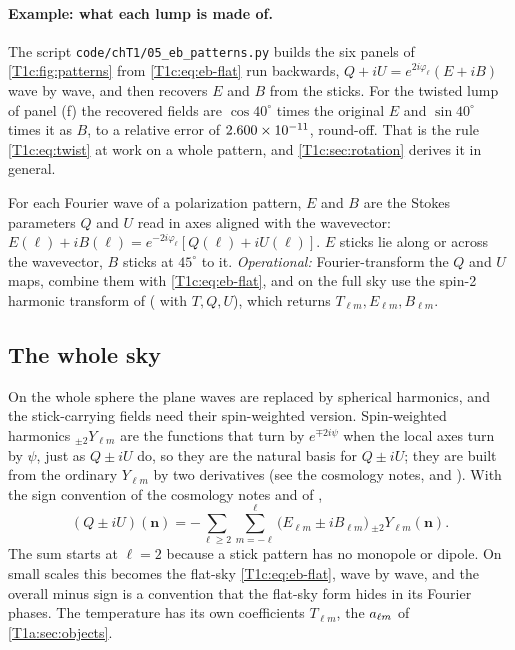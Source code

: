 \paragraph{Example: what each lump is made of.} The script \nolinkurl{code/chT1/05_eb_patterns.py} builds the six panels of \cref{T1c:fig:patterns} from \eqref{T1c:eq:eb-flat} run backwards, $Q+iU=e^{2i\varphi_{\bm\ell}}(E+iB)$ wave by wave, and then recovers $E$ and $B$ from the sticks. For the twisted lump of panel (f) the recovered fields are $\cos40^\circ$ times the original $E$ and $\sin40^\circ$ times it as $B$, to a relative error of $2.600\times10^{-11}$, round-off. That is the rule \eqref{T1c:eq:twist} at work on a whole pattern, and \cref{T1c:sec:rotation} derives it in general.

\begin{workdef}
For each Fourier wave of a polarization pattern, $E$ and $B$ are the Stokes parameters $Q$ and $U$ read in axes aligned with the wavevector: $E(\bm\ell)+iB(\bm\ell)=e^{-2i\varphi_{\bm\ell}}[Q(\bm\ell)+iU(\bm\ell)]$. $E$ sticks lie along or across the wavevector, $B$ sticks at $45^\circ$ to it. \emph{Operational:} Fourier-transform the $Q$ and $U$ maps, combine them with \eqref{T1c:eq:eb-flat}, and on the full sky use the spin-2 harmonic transform of  ( with $T,Q,U$), which returns $T_{\ell m},E_{\ell m},B_{\ell m}$.
\end{workdef}

\subsection{The whole sky}
\label{T1c:sec:eb-sky}

On the whole sphere the plane waves are replaced by spherical harmonics, and the stick-carrying fields need their spin-weighted version. Spin-weighted harmonics ${}_{\pm2}Y_{\ell m}$ are the functions that turn by $e^{\mp2i\psi}$ when the local axes turn by $\psi$, just as $Q\pm iU$ do, so they are the natural basis for $Q\pm iU$; they are built from the ordinary $Y_{\ell m}$ by two derivatives (see the cosmology notes, and \cite{ZaldarriagaSeljak1997,Kamionkowski1997}). With the sign convention of the cosmology notes and of \cite{ZaldarriagaSeljak1997},
\begin{equation}
(Q\pm iU)(\bm n)=-\sum_{\ell\ge2}\sum_{m=-\ell}^{\ell}\bigl(E_{\ell m}\pm iB_{\ell m}\bigr)\,{}_{\pm2}Y_{\ell m}(\bm n).
\label{T1c:eq:eb-sky}
\end{equation}
The sum starts at $\ell=2$ because a stick pattern has no monopole or dipole. On small scales this becomes the flat-sky \eqref{T1c:eq:eb-flat}, wave by wave, and the overall minus sign is a convention that the flat-sky form hides in its Fourier phases. The temperature has its own coefficients $T_{\ell m}$, the $a_{\ell m}$ of \cref{T1a:sec:objects}.

